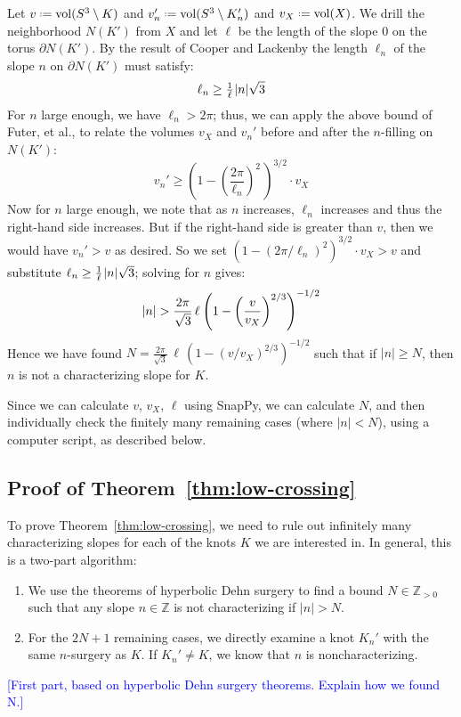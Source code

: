 \documentclass[11pt,usenames,dvipsnames,reqno]{amsart}
\newcommand{\zz}{\mathbb{Z}}
\newcommand{\vol}{\operatorname{vol}}
\newcommand{\defeq}{\mathrel{\vcenter{\baselineskip0.5ex\lineskiplimit0pt\hbox{\scriptsize.}\hbox{\scriptsize.}}}=}
\newcommand{\hs}{\hspace{0.05em}} %
\numberwithin{theorem}{section}
\theoremstyle{ex}
\theoremstyle{rem}
\def\kh#1{\textcolor{Blue}{#1}}
\begin{document}
Let $v\defeq\vol(S^3\setminus K)$ and $v_n'\defeq\vol(S^3\setminus K_n')$ and $v_X\defeq\vol(X)$. We drill the neighborhood $N(K')$ from $X$ and let $\ell$ be the length of the slope $0$ on the torus $\partial N(K')$. 
By the result of Cooper and Lackenby the length ${\ell}_n$ of the slope $n$ on $\partial N(K')$ must satisfy:
$${\ell}_n\ge\tfrac{1}{\ell}\hs|n|\sqrt{3}$$
For $n$ large enough, we have ${\ell}_n>2\pi$; thus, we can apply the above bound of Futer, et al., to relate the volumes $v_X$ and $v_n'$ before and after the $n$-filling on $N(K')$:
$$v_n'\ge\left(1-\left(\frac{2\pi}{{\ell}_n}\right)^2\,\right)^{3/2}\cdot v_X$$
Now for $n$ large enough, we note that as $n$ increases, ${\ell}_n$ increases and thus the right-hand side increases. But if the right-hand side is greater than $v$, then we would have $v_n'>v$ as desired. So we set $(1-(2\pi/{\ell}_n)^2)^{3/2}\cdot v_X>v$ and substitute ${\ell}_n\ge\frac{1}{\ell}\hs|n|\sqrt{3}$; solving for $n$ gives:
$$|n|>\frac{2\pi}{\sqrt{3}}\,\ell\hs\left(1-\left(\frac{v}{v_X}\right)^{2/3}\right)^{-1/2}$$
Hence we have found $N=\frac{2\pi}{\sqrt{3}}\,\ell\,(1-(v/v_X)^{2/3})^{-1/2}$ such that if $|n|\ge N$, then $n$ is not a characterizing slope for $K$.

Since we can calculate $v$, $v_X$, $\ell$ using SnapPy, we can calculate $N$, and then individually check the finitely many remaining cases (where $|n|<N$), using a computer script, as described below.

\subsection{Proof of Theorem~\ref{thm:low-crossing}}

To prove Theorem~\ref{thm:low-crossing}, we need to rule out infinitely many characterizing slopes for each of the knots $K$ we are interested in. In general, this is a two-part algorithm:

\begin{enumerate}
	\item We use the theorems of hyperbolic Dehn surgery to find a bound $N \in \zz_{>0}$ such that any slope $n \in \zz$ is not characterizing if $|n|>N$.
	\item For the $2 N + 1$ remaining cases, we directly examine a knot $K_{n}'$ with the same $n$-surgery as $K$. If $K_{n}' \neq K$, we know that $n$ is noncharacterizing.
\end{enumerate}

\kh{[First part, based on hyperbolic Dehn surgery theorems. Explain how we found N.]}
\end{document}
